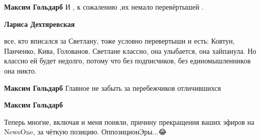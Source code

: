 \begin{itemize}
\begin{itemize}
 
\textbf{Максим Гольдарб} И , к сожалению ,их немало перевёртышей .

 
\textbf{Лариса Дехтяревская} 

все, кто вписался за Светлану, тоже условно перевертыши и есть: Ковтун,
Панченко, Кива, Голованов. Светлане классно, она улыбается, она хайпанула. Но
классно ей будет недолго, потому что без подписчиков, без единомышленников она
никто.


 
\textbf{Максим Гольдарб} Главное не забыть за перебежчиков отличившихся

 
\textbf{Максим Гольдарб} 

Теперь многие, включая и меня поняли, причину прекращения ваших эфиров на
NewsOne, за чёткую позицию. ОппозиционЭры...😂

\end{itemize}


\end{itemize}

